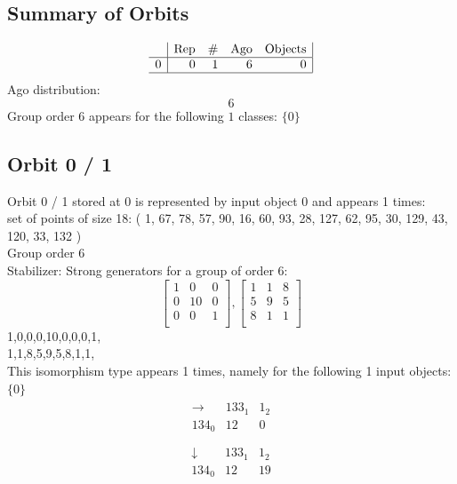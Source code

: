 

\subsection{Summary of Orbits}
\label{app:EC_11_1_3}
$$
\begin{array}{r|*{4}{r}|}
 & \mbox{Rep} & \# & \mbox{Ago} & \mbox{Objects}\\
\hline
0 & 0 & 1 & 6 & 0\\
\hline
\end{array}
$$
Ago distribution: 
$$
6
$$
Group order $6$ appears for the following $1$ classes: $
\{ 0 \}$\\
\subsection*{Orbit 0 / 1}
Orbit 0 / 1 stored at 0 is represented by input object 0 and appears 1 times: \\
set of points of size 18: ( 1, 67, 78, 57, 90, 16, 60, 93, 28, 127, 62, 95, 30, 129, 43, 120, 33, 132 )
\\
Group order 6\\
Stabilizer:
Strong generators for a group of order 6:
$$
\left[
\begin{array}{*{3}{r}}
1 & 0 & 0\\
0 & 10 & 0\\
0 & 0 & 1\\
\end{array}
\right]
, 
\left[
\begin{array}{*{3}{r}}
1 & 1 & 8\\
5 & 9 & 5\\
8 & 1 & 1\\
\end{array}
\right]
$$
1,0,0,0,10,0,0,0,1,\\
1,1,8,5,9,5,8,1,1,\\
This isomorphism type appears 1 times, namely for the following 1 input objects: 
$
\{ 0 \}$\\
{\renewcommand{\arraycolsep}{1pt}
\begin{align*}
\begin{array}{r|*{2}{r}}
\rightarrow  &    133_{  1} &      1_{  2}\\
\hline
   134_{  0} &           12 &            0\\
\end{array}
\end{align*}
}
{\renewcommand{\arraycolsep}{1pt}
\begin{align*}
\begin{array}{r|*{2}{r}}
\downarrow  &    133_{  1} &      1_{  2}\\
\hline
   134_{  0} &           12 &           19\\
\end{array}
\end{align*}
}
